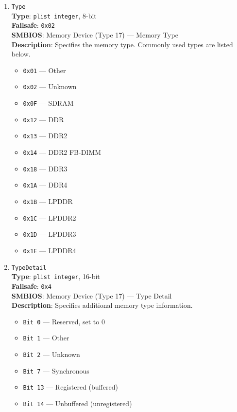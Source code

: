 \documentclass[]{article}
\providecommand{\tightlist}{%
  \setlength{\itemsep}{0pt}\setlength{\parskip}{0pt}}
\begin{document}
\begin{enumerate}
\item
  \texttt{Type}\\
  \textbf{Type}: \texttt{plist\ integer}, 8-bit\\
  \textbf{Failsafe}: \texttt{0x02}\\
  \textbf{SMBIOS}: Memory Device (Type 17) --- Memory Type\\
  \textbf{Description}: Specifies the memory type. Commonly used types are listed below.

  \begin{itemize}
  \tightlist
  \item
    \texttt{0x01} --- Other
  \item
    \texttt{0x02} --- Unknown
  \item
    \texttt{0x0F} --- SDRAM
  \item
    \texttt{0x12} --- DDR
  \item
    \texttt{0x13} --- DDR2
  \item
    \texttt{0x14} --- DDR2 FB-DIMM
  \item
    \texttt{0x18} --- DDR3
  \item
    \texttt{0x1A} --- DDR4
  \item
    \texttt{0x1B} --- LPDDR
  \item
    \texttt{0x1C} --- LPDDR2
  \item
    \texttt{0x1D} --- LPDDR3
  \item
    \texttt{0x1E} --- LPDDR4
  \end{itemize}

\item
  \texttt{TypeDetail}\\
  \textbf{Type}: \texttt{plist\ integer}, 16-bit\\
  \textbf{Failsafe}: \texttt{0x4}\\
  \textbf{SMBIOS}: Memory Device (Type 17) --- Type Detail\\
  \textbf{Description}: Specifies additional memory type information.

  \begin{itemize}
  \tightlist
  \item
    \texttt{Bit 0} --- Reserved, set to 0
  \item
    \texttt{Bit 1} --- Other
  \item
    \texttt{Bit 2} --- Unknown
  \item
    \texttt{Bit 7} --- Synchronous
  \item
    \texttt{Bit 13} --- Registered (buffered)
  \item
    \texttt{Bit 14} --- Unbuffered (unregistered)
  \end{itemize}

\end{enumerate}
\end{document}
